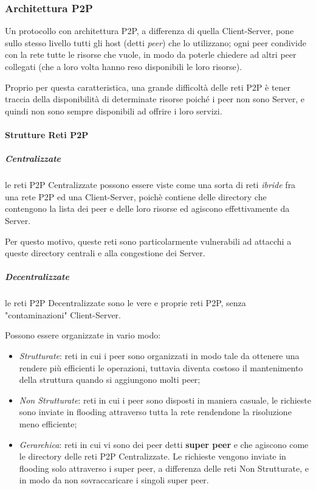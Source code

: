 \documentclass[a4paper]{article}
\begin{document}
			\newpage
			
			
		\subsubsection{Architettura P2P}
		
			Un protocollo con architettura P2P, a differenza di quella Client-Server, pone sullo stesso livello tutti gli host (detti \emph{peer}) che lo utilizzano; ogni peer condivide con la rete tutte le risorse che vuole, in modo da poterle chiedere ad altri peer collegati (che a loro volta hanno reso disponibili le loro risorse).
			
			Proprio per questa caratteristica, una grande difficoltà delle reti P2P è tener traccia della disponibilità di determinate risorse poiché i peer non sono Server, e quindi non sono sempre disponibili ad offrire i loro servizi.
			
			\paragraph{Strutture Reti P2P}
				
				\subparagraph{Centralizzate}
					le reti P2P Centralizzate possono essere viste come una sorta di reti \emph{ibride} fra una rete P2P ed una Client-Server, poichè contiene delle directory che contengono la lista dei peer e delle loro risorse ed agiscono effettivamente da Server.
	
					Per questo motivo, queste reti sono particolarmente vulnerabili ad attacchi a queste directory centrali e alla congestione dei Server. 
					
					
				\subparagraph{Decentralizzate}
					le reti P2P Decentralizzate sono le vere e proprie reti P2P, senza "contaminazioni" Client-Server.
	
					Possono essere organizzate in vario modo:
					\begin{itemize}
						\item \emph{Strutturate}: reti in cui i peer sono organizzati in modo tale da ottenere una rendere più efficienti le operazioni, tuttavia diventa costoso il mantenimento della struttura quando si aggiungono molti peer;
						\item \emph{Non Strutturate}: reti in cui i peer sono disposti in maniera casuale, le richieste sono inviate in flooding attraverso tutta la rete rendendone la risoluzione meno efficiente;
						\item \emph{Gerarchica}: reti in cui vi sono dei peer detti \textbf{super peer} e che agiscono come le directory delle reti P2P Centralizzate. Le richieste vengono inviate in flooding solo attraverso i super peer, a differenza delle reti Non Strutturate, e in modo da non sovraccaricare i singoli super peer.
					\end{itemize}
					
\end{document}
